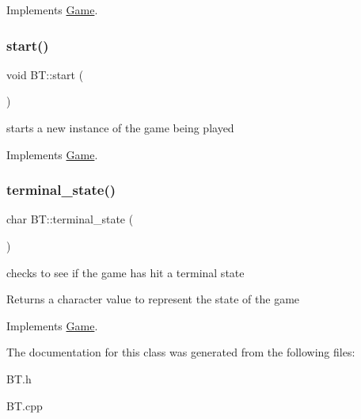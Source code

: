 Implements \hyperlink{class_game_a205fc7dd195bc398138cc188aad8bc38}{Game}.

\mbox{\label{class_b_t_acb87d577e00a5fa66ddb653c697e3ad4}} 
\subsubsection{\texorpdfstring{start()}{start()}}
{\footnotesize\ttfamily void B\+T\+::start (\begin{DoxyParamCaption}{ }\end{DoxyParamCaption})\hspace{0.3cm}{\ttfamily [virtual]}}



starts a new instance of the game being played 



Implements \hyperlink{class_game_add988158041df85337995e36f06756aa}{Game}.

\mbox{\label{class_b_t_a5b09c0eb2d583ae2141aeefe18545e5c}} 
\subsubsection{\texorpdfstring{terminal\+\_\+state()}{terminal\_state()}}
{\footnotesize\ttfamily char B\+T\+::terminal\+\_\+state (\begin{DoxyParamCaption}{ }\end{DoxyParamCaption})\hspace{0.3cm}{\ttfamily [virtual]}}



checks to see if the game has hit a terminal state 

\begin{DoxyReturn}{Returns}
a character value to represent the state of the game 
\end{DoxyReturn}


Implements \hyperlink{class_game_ac7cbe36964272dd7dcd7e68fafaf24cc}{Game}.



The documentation for this class was generated from the following files\+:\begin{DoxyCompactItemize}
\item 
B\+T.\+h\item 
B\+T.\+cpp\end{DoxyCompactItemize}
